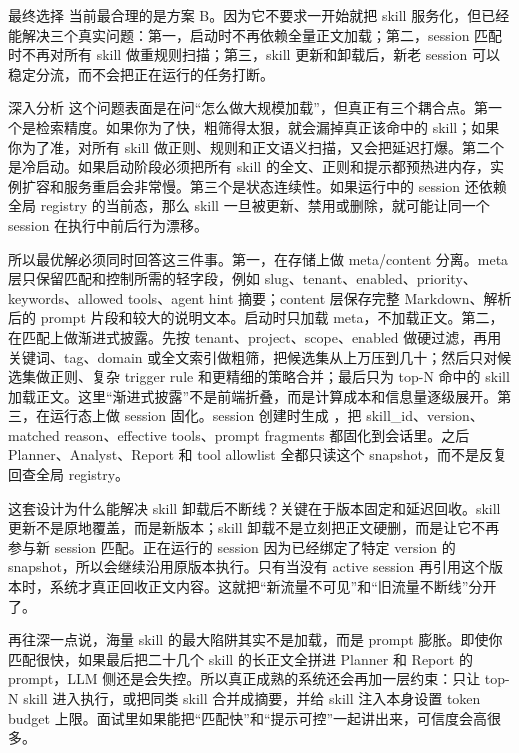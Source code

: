 \documentclass[12pt]{article}
\begin{document}
\begin{summaryBox}{最终选择}
当前最合理的是方案 B。因为它不要求一开始就把 skill 服务化，但已经能解决三个真实问题：第一，启动时不再依赖全量正文加载；第二，session 匹配时不再对所有 skill 做重规则扫描；第三，skill 更新和卸载后，新老 session 可以稳定分流，而不会把正在运行的任务打断。
\end{summaryBox}

\begin{analysisBox}{深入分析}
这个问题表面是在问“怎么做大规模加载”，但真正有三个耦合点。第一个是检索精度。如果你为了快，粗筛得太狠，就会漏掉真正该命中的 skill；如果你为了准，对所有 skill 做正则、规则和正文语义扫描，又会把延迟打爆。第二个是冷启动。如果启动阶段必须把所有 skill 的全文、正则和提示都预热进内存，实例扩容和服务重启会非常慢。第三个是状态连续性。如果运行中的 session 还依赖全局 registry 的当前态，那么 skill 一旦被更新、禁用或删除，就可能让同一个 session 在执行中前后行为漂移。

所以最优解必须同时回答这三件事。第一，在存储上做 meta/content 分离。meta 层只保留匹配和控制所需的轻字段，例如 slug、tenant、enabled、priority、keywords、allowed tools、agent hint 摘要；content 层保存完整 Markdown、解析后的 prompt 片段和较大的说明文本。启动时只加载 meta，不加载正文。第二，在匹配上做渐进式披露。先按 tenant、project、scope、enabled 做硬过滤，再用关键词、tag、domain 或全文索引做粗筛，把候选集从上万压到几十；然后只对候选集做正则、复杂 trigger rule 和更精细的策略合并；最后只为 top-N 命中的 skill 加载正文。这里“渐进式披露”不是前端折叠，而是计算成本和信息量逐级展开。第三，在运行态上做 session 固化。session 创建时生成 ，把 skill\_id、version、matched reason、effective tools、prompt fragments 都固化到会话里。之后 Planner、Analyst、Report 和 tool allowlist 全都只读这个 snapshot，而不是反复回查全局 registry。

这套设计为什么能解决 skill 卸载后不断线？关键在于版本固定和延迟回收。skill 更新不是原地覆盖，而是新版本；skill 卸载不是立刻把正文硬删，而是让它不再参与新 session 匹配。正在运行的 session 因为已经绑定了特定 version 的 snapshot，所以会继续沿用原版本执行。只有当没有 active session 再引用这个版本时，系统才真正回收正文内容。这就把“新流量不可见”和“旧流量不断线”分开了。

再往深一点说，海量 skill 的最大陷阱其实不是加载，而是 prompt 膨胀。即使你匹配很快，如果最后把二十几个 skill 的长正文全拼进 Planner 和 Report 的 prompt，LLM 侧还是会失控。所以真正成熟的系统还会再加一层约束：只让 top-N skill 进入执行，或把同类 skill 合并成摘要，并给 skill 注入本身设置 token budget 上限。面试里如果能把“匹配快”和“提示可控”一起讲出来，可信度会高很多。
\end{analysisBox}
\end{document}
